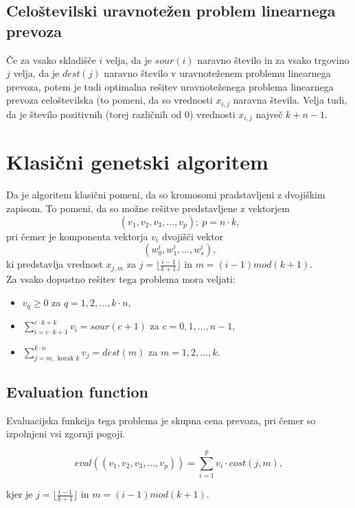 \documentclass[12pt,a4paper,twoside]{article}
\theoremstyle{definition} %
\theoremstyle{plain} %
\numberwithin{equation}{section}  %
\begin{document}
\subsection{Celoštevilski uravnotežen problem linearnega prevoza}

Če za vsako skladišče $i$ velja, da je $sour(i)$ naravno število in za vsako trgovino $j$ velja, da je $dest(j)$ naravno število v uravnoteženem problemu linearnega prevoza, potem je tudi optimalna rešitev uravnoteženega problema linearnega prevoza celoštevilska (to pomeni, da so vrednosti $x_{i,j}$ naravna števila. Velja tudi, da je število pozitivnih (torej različnih od $0$) vrednosti $x_{i,j}$ največ $k+n-1$.

\section{Klasični genetski algoritem}

Da je algoritem klasični pomeni, da so kromosomi pradstavljeni z dvojiškim zapisom. To pomeni, da so možne rešitve predstavljene z vektorjem $$(v_1, v_2, v_3, \dots, v_p);~p=n \cdot k \text{,}$$ pri čemer je komponenta vektorja $v_i$  dvojišči vektor $$(w_0^i, w_1^i, \dots, w_s^i) \text{,}$$ ki predstavlja vrednost $x_{j,m}$ za $j= \lfloor \frac{i-1}{k+1} \rfloor$ in $m= (i-1) mod (k+1)$. \\

\noindent Za vsako dopustno rešitev tega problema mora veljati:
\begin{itemize}
\item $v_q \geq 0$ za $q=1, 2, \dots, k \cdot n$,
\item $\sum\limits_{i=c \cdot k + 1}^{c \cdot k + k} v_i = sour(c+1)$ za $c=0, 1, \dots, n-1$,
\item $\sum\limits_{j=m, \text{ korak } k}^{k \cdot n} v_j = dest(m)$ za $m=1, 2, \dots, k$.
\end{itemize}

\subsection{Evaluation function}

Evaluacijska funkcija tega problema je skupna cena prevoza, pri čemer so izpolnjeni vsi zgornji pogoji.

$$eval((v_1, v_2, v_3, \dots, v_p)) = \sum\limits_{i=1}^{p} v_i \cdot cost(j,m),$$

kjer je $j=\lfloor \frac{i-1}{k+1} \rfloor$ in $m=(i-1) mod(k+1)$.
\end{document}
